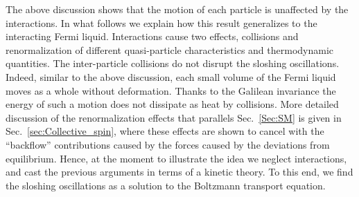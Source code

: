 The above discussion shows that the motion of each particle is unaffected by the interactions.
In what follows we explain how this result generalizes to the interacting Fermi liquid.
Interactions cause two effects, collisions and renormalization of different quasi-particle characteristics and thermodynamic quantities.
The inter-particle collisions do not disrupt the sloshing oscillations.
Indeed, similar to the above discussion, each small volume of the Fermi liquid moves as a whole without deformation.
Thanks to the Galilean invariance the energy of such a motion does not dissipate as heat by collisions.
More detailed discussion of the renormalization effects that parallels Sec.~\ref{Sec:SM} is given in Sec.~\ref{sec:Collective_spin}, 
where these effects are shown to cancel with the ``backflow'' contributions caused by the forces caused by the deviations from equilibrium.
Hence, at the moment to illustrate the idea we neglect interactions, and cast the previous arguments in terms of a kinetic theory. 
To this end, we find the sloshing oscillations as a solution to the Boltzmann transport equation.


